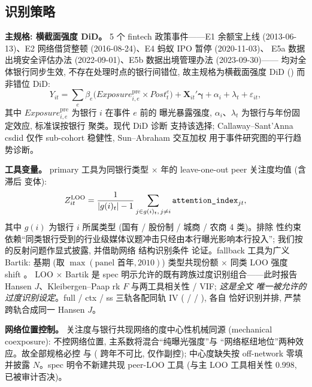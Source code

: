 \subsection{识别策略}\label{subsec:ident}
\textbf{主规格: 横截面强度 DiD。} 5 个 fintech 政策事件——E1 余额宝上线
(2013-06-13)、E2 网络借贷整顿 (2016-08-24)、E4 蚂蚁 IPO 暂停 (2020-11-03)、
E5a 数据出境安全评估办法 (2022-09-01)、E5b 数据出境管理办法 (2023-09-30)——
均对全体银行同步生效, 不存在处理时点的银行间错位, 故主规格为横截面强度
DiD () 而非错位 DiD:
\begin{equation}\label{eq:did}
Y_{it} = \sum_{e} \beta_e \bigl(\mathit{Exposure}^{\mathrm{pre}}_{i,e}
\times \mathit{Post}^{e}_{t}\bigr) + \mathbf{X}_{it}'\boldsymbol{\gamma}
+ \alpha_i + \lambda_t + \varepsilon_{it},
\end{equation}
其中 $\mathit{Exposure}^{\mathrm{pre}}_{i,e}$ 为银行 $i$ 在事件 $e$ 前的
曝光暴露强度, $\alpha_i$、$\lambda_t$ 为银行与年份固定效应, 标准误按银行
聚类。现代 DiD 诊断 \parencite{baker2022staggered} 支持该选择;
Callaway--Sant'Anna csdid \parencite{callaway2021difference} 仅作
sub-cohort 稳健性, Sun--Abraham 交互加权 \parencite{sun2021estimating}
用于事件研究图的平行趋势诊断。

\textbf{工具变量。} primary 工具为同银行类型 $\times$ 年的 leave-one-out
peer 关注度均值 (含滞后  变体):
\begin{equation}\label{eq:iv}
Z^{\mathrm{LOO}}_{it} = \frac{1}{|g(i)_t| - 1}
\sum_{j \in g(i)_t,\, j \neq i} \texttt{attention\_index}_{jt},
\end{equation}
其中 $g(i)$ 为银行 $i$ 所属类型 (国有 / 股份制 / 城商 / 农商 4 类)。排除
性约束依赖``同类银行受到的行业级媒体议题冲击只经由本行曝光影响本行投入'';
我们按 \textcite{manski1993reflection} 的反射问题作显式披露, 并借助网络
结构识别条件 \parencite{bramoulle2009peer} 论证。fallback 工具为广义
Bartik: 基期 (取 $\max(\text{panel 首年}, 2010)$) 类型共现份额 $\times$
同类 LOO 强度 shift \parencite{goldsmith2020bartik,borusyak2022shiftshare}。
LOO $\times$ Bartik 是 spec 明示允许的既有跨族过度识别组合——此时报告
Hansen $J$、Kleibergen--Paap rk $F$ 与两工具相关性 / VIF; \emph{这是全文
唯一被允许的过度识别设定}。full / ctx / ss 三轨各配同轨 IV
( /
 / ), 各自
恰好识别并排, 严禁跨轨合成同一 Hansen $J$。

\textbf{网络位置控制。} 关注度与银行共现网络的度中心性机械同源
(mechanical coexposure): 不控网络位置, 主系数将混合``纯曝光强度''与
``网络枢纽地位''两种效应。故全部规格必控  与
 ( 跨年不可比, 仅作副控);
中心度缺失按 off-network 零填并披露 $N$。spec 明令不新建共现 peer-LOO
工具 (与主 LOO 工具相关性 0.998, 已被审计否决)。

